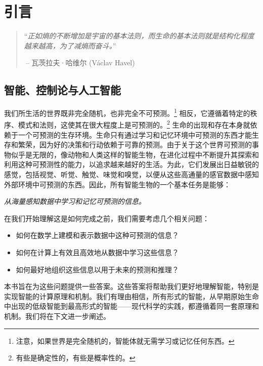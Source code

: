 \documentclass[../../book-main_zh.tex]{subfiles}
\begin{document}
\chapter{引言}
\label{ch:intro}

\begin{quote}
“{\em 正如熵的不断增加是宇宙的基本法则，而生命的基本法则就是结构化程度越来越高，为了减熵而奋斗。}”

$~$\hfill -- 瓦茨拉夫·哈维尔 (V\'{a}clav Havel)
 \end{quote}
\vspace{5mm}



\section{智能、控制论与人工智能}
我们所生活的世界既非完全随机，也非完全不可预测。\footnote{注意，如果世界是完全随机的，智能体就无需学习或记忆任何东西。} 相反，它遵循着特定的秩序、模式和法则，这使其在很大程度上是可预测的。\footnote{有些是确定性的，有些是概率性的。} 生命的出现和存在本身就依赖于一个可预测的生存环境。生命只有通过学习和记忆环境中可预测的东西才能生存和繁荣，因为好的决策和行动依赖于可靠的预测。由于关于这个世界可预测的事物似乎是无限的，像动物和人类这样的智能生物，在进化过程中不断提升其探索和利用这种可预测性的能力，以追求越来越好的生活。为此，它们发展出日益敏锐的感觉，包括视觉、听觉、触觉、味觉和嗅觉，以便从这些高通量的感官数据中感知外部环境中可预测的东西。因此，所有智能生物的一个基本任务是能够：
\begin{center}
    {\em 从海量感知数据中学习和记忆可预测的信息。}
\end{center}
在我们开始理解这是如何完成之前，我们需要考虑几个相关问题：
\begin{itemize}
    \item 如何在数学上建模和表示数据中这种可预测的信息？
    \item 如何在计算上有效且高效地从数据中学习这些信息？
    \item 如何最好地组织这些信息以用于未来的预测和推理？
\end{itemize}
本书旨在为这些问题提供一些答案。这些答案将帮助我们更好地理解智能，特别是实现智能的计算原理和机制。我们有理由相信，所有形式的智能，从早期原始生命中出现的低级智能到最高形式的智能——现代科学的实践，都遵循着同一套原理和机制。我们将在下文进一步阐述。
\end{document}
